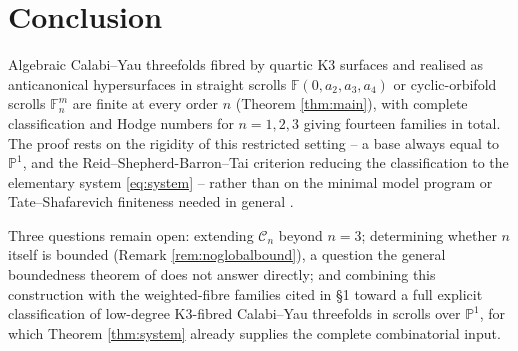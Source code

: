 \documentclass[11pt]{article}
\newcommand{\PP}{\mathbb{P}}
\newcommand{\F}{\mathbb{F}}
\begin{document}
	\section{Conclusion}
	
	Algebraic Calabi--Yau threefolds fibred by quartic K3 surfaces and realised as anticanonical hypersurfaces in straight scrolls $\F(0,a_2,a_3,a_4)$ or cyclic-orbifold scrolls $\F^m_n$ are finite at every order $n$ (Theorem \ref{thm:main}), with complete classification and Hodge numbers for $n=1,2,3$ giving fourteen families in total. The proof rests on the rigidity of this restricted setting -- a base always equal to $\PP^1$, and the Reid--Shepherd-Barron--Tai criterion reducing the classification to the elementary system \eqref{eq:system} -- rather than on the minimal model program or Tate--Shafarevich finiteness needed in general \cite{Gross1994,EngelFilipazziGreerMauriSvaldi2025}.
	
	Three questions remain open: extending $\mathcal C_n$ beyond $n=3$; determining whether $n$ itself is bounded (Remark \ref{rem:noglobalbound}), a question the general boundedness theorem of \cite{EngelFilipazziGreerMauriSvaldi2025} does not answer directly; and combining this construction with the weighted-fibre families cited in \S1 toward a full explicit classification of low-degree K3-fibred Calabi--Yau threefolds in scrolls over $\PP^1$, for which Theorem \ref{thm:system} already supplies the complete combinatorial input.
	
\end{document}
